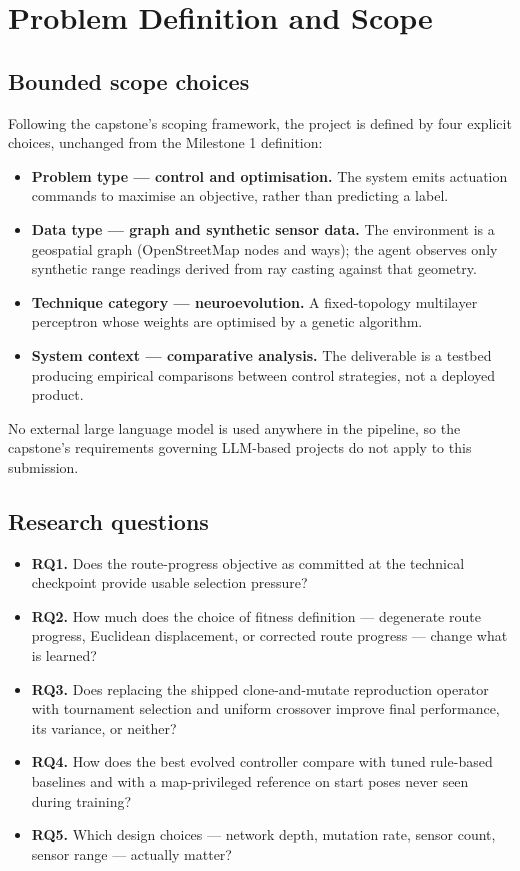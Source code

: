 \documentclass[conference]{IEEEtran}
\begin{document}
\section{Problem Definition and Scope}

\label{sec:scope}

\subsection{Bounded scope choices}

Following the capstone's scoping framework, the project is defined by four explicit choices, unchanged from the Milestone 1 definition:

\begin{itemize}
\item \textbf{Problem type — control and optimisation.} The system emits actuation commands to maximise an objective, rather than predicting a label.
\item \textbf{Data type — graph and synthetic sensor data.} The environment is a geospatial graph (OpenStreetMap nodes and ways); the agent observes only synthetic range readings derived from ray casting against that geometry.
\item \textbf{Technique category — neuroevolution.} A fixed-topology multilayer perceptron whose weights are optimised by a genetic algorithm.
\item \textbf{System context — comparative analysis.} The deliverable is a testbed producing empirical comparisons between control strategies, not a deployed product.
\end{itemize}

No external large language model is used anywhere in the pipeline, so the capstone's requirements governing LLM-based projects do not apply to this submission.

\subsection{Research questions}

\begin{itemize}
\item \textbf{RQ1.} Does the route-progress objective as committed at the technical checkpoint provide usable selection pressure?
\item \textbf{RQ2.} How much does the choice of fitness definition — degenerate route progress, Euclidean displacement, or corrected route progress — change what is learned?
\item \textbf{RQ3.} Does replacing the shipped clone-and-mutate reproduction operator with tournament selection and uniform crossover improve final performance, its variance, or neither?
\item \textbf{RQ4.} How does the best evolved controller compare with tuned rule-based baselines and with a map-privileged reference on start poses never seen during training?
\item \textbf{RQ5.} Which design choices — network depth, mutation rate, sensor count, sensor range — actually matter?
\end{itemize}
\end{document}
